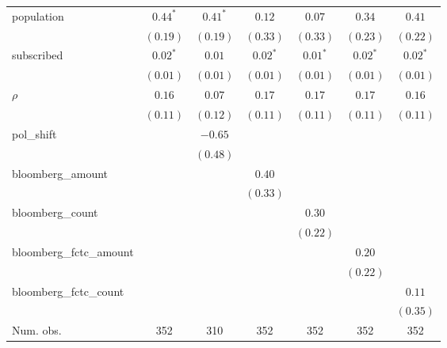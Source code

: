 \begin{table}[!h]
\begin{center}
\begin{tabular}{l c c c c c c }
population              & $0.44^{*}$   & $0.41^{*}$   & $0.12$       & $0.07$       & $0.34$       & $0.41$       \\
                        & $(0.19)$     & $(0.19)$     & $(0.33)$     & $(0.33)$     & $(0.23)$     & $(0.22)$     \\
subscribed              & $0.02^{*}$   & $0.01$       & $0.02^{*}$   & $0.01^{*}$   & $0.02^{*}$   & $0.02^{*}$   \\
                        & $(0.01)$     & $(0.01)$     & $(0.01)$     & $(0.01)$     & $(0.01)$     & $(0.01)$     \\
$\rho$                  & $0.16$       & $0.07$       & $0.17$       & $0.17$       & $0.17$       & $0.16$       \\
                        & $(0.11)$     & $(0.12)$     & $(0.11)$     & $(0.11)$     & $(0.11)$     & $(0.11)$     \\
pol\_shift              &              & $-0.65$      &              &              &              &              \\
                        &              & $(0.48)$     &              &              &              &              \\
bloomberg\_amount       &              &              & $0.40$       &              &              &              \\
                        &              &              & $(0.33)$     &              &              &              \\
bloomberg\_count        &              &              &              & $0.30$       &              &              \\
                        &              &              &              & $(0.22)$     &              &              \\
bloomberg\_fctc\_amount &              &              &              &              & $0.20$       &              \\
                        &              &              &              &              & $(0.22)$     &              \\
bloomberg\_fctc\_count  &              &              &              &              &              & $0.11$       \\
                        &              &              &              &              &              & $(0.35)$     \\
\midrule
Num. obs.               & 352          & 310          & 352          & 352          & 352          & 352          \\

\end{tabular}
\end{center}
\end{table}
